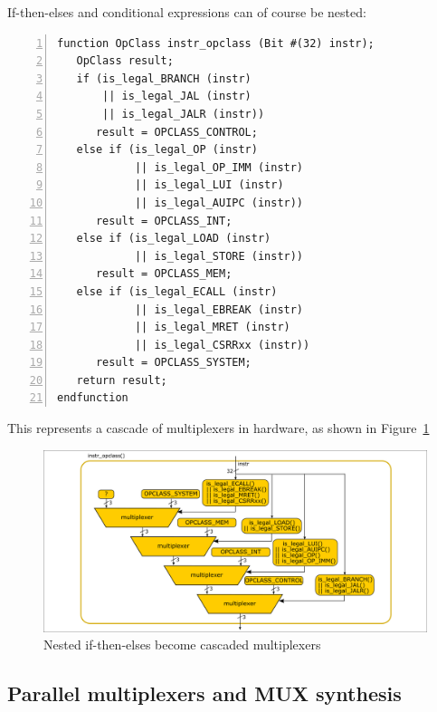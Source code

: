 If-then-elses and conditional expressions can of course be nested:


{\footnotesize
\begin{Verbatim}[frame=single, numbers=left]
function OpClass instr_opclass (Bit #(32) instr);
   OpClass result;
   if (is_legal_BRANCH (instr)
       || is_legal_JAL (instr)
       || is_legal_JALR (instr))
      result = OPCLASS_CONTROL;
   else if (is_legal_OP (instr)
            || is_legal_OP_IMM (instr)
            || is_legal_LUI (instr)
            || is_legal_AUIPC (instr))
      result = OPCLASS_INT;
   else if (is_legal_LOAD (instr)
            || is_legal_STORE (instr))
      result = OPCLASS_MEM;
   else if (is_legal_ECALL (instr)
            || is_legal_EBREAK (instr)
            || is_legal_MRET (instr)
            || is_legal_CSRRxx (instr))
      result = OPCLASS_SYSTEM;
   return result;
endfunction
\end{Verbatim}
}

This represents a cascade of multiplexers in hardware, as shown in
Figure~\ref{Fig_Combo_Multiplexer_Cascade}
\begin{figure}[htbp]
  \centerline{\includegraphics[width=6in,angle=0]{Figures/Fig_Combo_Multiplexer_Cascade}}
  \caption{\label{Fig_Combo_Multiplexer_Cascade}Nested if-then-elses become cascaded multiplexers}
\end{figure}


\subsection{Parallel multiplexers and MUX synthesis}

\label{Sec_MUXes}


